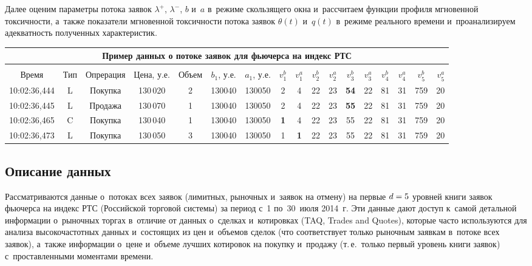 \begin{multicols}{2}
{}

Далее оценим параметры потока заявок
$\lambda^+$, $\lambda^-$, $b$ и~$a$ в~режиме скользящего окна и~рассчитаем
функции профиля мгновенной токсичности, а~так\-же показатели
мгновенной токсичности потока \mbox{заявок} $\theta(t)$ и~$q(t)$ в~режиме
реального времени и~проанализируем адекватность полученных
характеристик.
{

}

\begin{table*}\small
\begin{center}


\tabcolsep=3.5pt
\begin{tabular}{|l|*{15}{c|}r|}
\multicolumn{17}{c}{Пример данных о потоке заявок для фьючерса на индекс РТС}\\[6pt]
\hline
&&&&&&&&&&&&&&&&\\[-9pt]
\multicolumn{1}{|c|}{Время} & Тип & Опрерация & Цена, у.е. & Объем & $b_1$, у.е. & $a_1$, у.е. & $v^b_1$ & $v^a_1$ & $v^b_2$ & $v^a_2$ & $v^b_3$ & $v^a_3$ & $v^b_4$ & $v^a_4$ & $v^b_5$ & $v^a_5$  \\
\hline
10:02:36,444 & L & Покупка & 130\,020 & 2 & 130040 & 130050 & 2 & 4 & 22 & 23 & {\bf 54} & 22 & 81 & 31 & 759 & 20 \\
10:02:36,445 & L & Продажа & 130\,070 & 1 & 130040 & 130050 & 2 & 4 & 22 & 23 & {\bf 55} & 22 & 81 & 31 & 759 & 20 \\
10:02:36,465 & C & Покупка & 130\,040 & 1 & 130040 & 130050 & {\bf 1} & 4 & 22 & 23 & 55 & 22 & 81 & 31 & 759 & 20 \\
10:02:36,473 & L & Покупка & 130\,050 & 3 & 130040 & 130050 & 1 & {\bf 1} & 22 & 23 & 55 & 22 & 81 & 31 & 759 & 20 \\
\hline
\end{tabular}
\end{center}
\end{table*}

\subsection{Описание данных}

Рассматриваются данные о~потоках всех заявок
(лимитных, рыночных и~заявок на отмену) на первые $d \hm= 5$
уровней книги заявок фьючерса на
индекс РТС (Российской торговой системы)
за период с~1 по~30~июля 2014~г. Эти данные дают доступ
к~самой детальной информации о~рыночных торгах в~отличие от данных
о~сделках и~котировках (TAQ, Trades and Quotes), которые часто
используются для анализа высокочастотных данных и~состоящих из цен
и~объемов сделок (что соответствует только рыночным заявкам в~потоке
всех заявок), а~так\-же информации о~цене и~объеме лучших котировок на
покупку и~продажу (т.\,е.\ только первый уровень книги заявок)
с~проставленными моментами времени.


\end{multicols}
